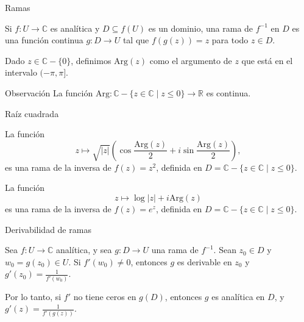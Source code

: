 \documentclass[spanish,presentation]{beamer}
\begin{document}
\begin{frame}[label=sec-3-3]{Ramas}
\begin{definition}[:B_definition:]
Si \(f\colon U\to \mathbb{C}\) es analítica y \(D\subseteq f(U)\)
es un dominio, una \alert{rama de \(f^{-1}\) en \(D\)} es una función
continua \(g\colon D\to U\) tal que \(f(g(z))=z\) para todo \(z\in
    D\).
\end{definition}

\begin{definition}
Dado \(z\in \mathbb{C}-\{0\}\), definimos
\(\mathrm{Arg}(z)\) como el argumento de \(z\) que está en el
intervalo \((-\pi,\pi]\).
\end{definition}

\begin{block}{Observación}
La función \(\mathrm{Arg}\colon \mathbb{C}-\{z\in \mathbb{C}\mid
    z\leq 0\}\to \mathbb{R}\) es continua.
\end{block}
\end{frame}

\begin{frame}[label=sec-3-4]{Raíz cuadrada}
\begin{example}[:B_example:]
La función
\begin{displaymath}
z\mapsto \sqrt{|z|}(\cos \frac{\mathrm{Arg}(z)}{2}+i\sin\frac{\mathrm{Arg}(z)}{2}),
\end{displaymath}
es una rama de la inversa de \(f(z)=z^{2}\), definida en
\(D=\mathbb{C}-\{z\in \mathbb{C}\mid z\leq 0\}\).
\end{example}

\begin{example}[:B_example:]
La función 
\begin{displaymath}
z\mapsto \log |z|+i\mathrm{Arg}(z)
\end{displaymath}
es una rama de la inversa de \(f(z)=e^{z}\), definida en
\(D=\mathbb{C}-\{z\in \mathbb{C}\mid z\leq 0\}\).
\end{example}
\end{frame}

\begin{frame}[label=sec-3-5]{Derivabilidad de ramas}
\begin{theorem}[:B_theorem:]
Sea \(f\colon U\to \mathbb{C}\) analítica, y sea \(g\colon D\to
    U\) una rama de \(f^{-1}\). Sean \(z_{0}\in D\) y
\(w_{0}=g(z_{0})\in U\). Si \(f'(w_{0})\ne 0\), entonces \(g\) es
derivable en \(z_{0}\) y \(g'(z_{0})=\frac{1}{f'(w_{0})}\).

Por lo tanto, si \(f'\) no tiene ceros en \(g(D)\), entonces \(g\)
es analítica en \(D\), y \(g'(z)=\frac{1}{f'(g(z))}\).
\end{theorem}
\end{frame}
\end{document}
